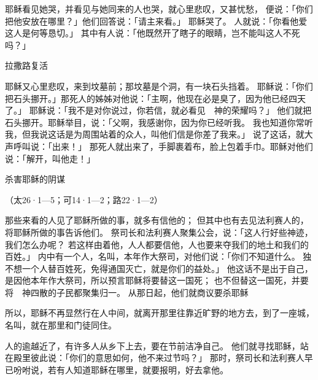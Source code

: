{耶稣看见她哭，并看见与她同来的{}人也哭，就心里悲叹，又甚忧愁，
便说：「你们把他安放在哪里？」他们回答说：「请主来看。」
耶稣哭了。
人就说：「你看他爱这人是何等恳切。」
其中有人说：「他既然开了瞎子的眼睛，岂不能叫这人不死吗？」
\par }{\SH 拉撒路复活
\par }{\PP {}耶稣又心里悲叹，来到坟墓前；那坟墓是个洞，有一块石头挡着。
耶稣说：「你们把石头挪开。」那死人的姊姊{}对他说：「主啊，他现在必是臭了，因为他{}已经四天了。」
耶稣说：「我不是对你说过，你若信，就必看见　神的荣耀吗？」
他们就把石头挪开。耶稣举目{}，说：「父啊，我感谢你，因为你已经听我。
我也知道你常听我，但我说这话是为周围站着的众人，叫他们信是你差了我来。」
说了这话，就大声呼叫说：「{}出来！」
那死人就出来了，手脚裹着布，脸上包着手巾。耶稣对他们说：「解开，叫他走！」
\par }{\SH 杀害耶稣的阴谋
\par }{\R （太26·1—5；可14·1—2；路22·1—2）
\par }{\PP {}那些来看{}的{}人见了耶稣所做的事，就多有信他的；
但其中也有去见法利赛人的，将耶稣所做的事告诉他们。
祭司长和法利赛人聚集公会，说：「这人行好些神迹，我们怎么办呢？
若这样由着他，人人都要信他，{}人也要来夺我们的地土和我们的百姓。」
内中有一个人，名叫{}，本年作大祭司，对他们说：「你们不知道什么。
独不想一个人替百姓死，免得通国灭亡，就是你们的益处。」
他这话不是出于自己，是因他本年作大祭司，所以预言耶稣将要替这一国死；
也不但替这一国死，并要将　神四散的子民都聚集归一。
从那日起，他们就商议要杀耶稣
\par }{\PP {}所以，耶稣不再显然行在{}人中间，就离开那里往靠近旷野的地方去，到了一座城，名叫{}，就在那里和门徒同住。
\par }{\PP {}人的逾越{}近了，有许多人从乡下上{}去，要在节前洁净自己。
他们就寻找耶稣，站在殿里彼此说：「你们的意思如何，他不来过节吗？」
那时，祭司长和法利赛人早已吩咐说，若有人知道耶稣在哪里，就要报明，好去拿他。

}
